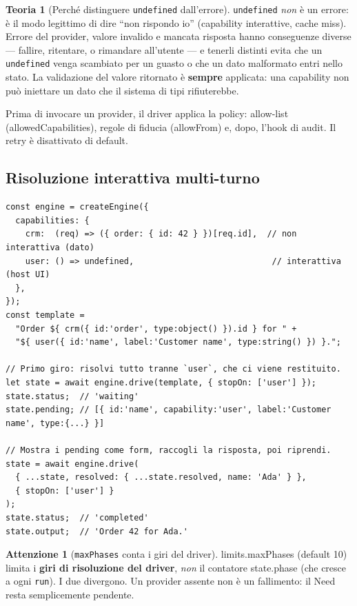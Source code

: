 \documentclass[11pt,a4paper]{book}
\let\code\lstinline
\newcommand{\ic}[1]{{\ttfamily #1}}
\theoremstyle{definition}
\newtheorem*{teoria}{Teoria}
\newtheorem*{attenzione}{Attenzione}
\begin{document}
{{{{\begin{teoria}[Perché distinguere \texttt{undefined} dall'errore]
\code|undefined| \emph{non} è un errore: è il modo legittimo di dire ``non rispondo
io'' (capability interattive, cache miss). Errore del provider, valore invalido e
mancata risposta hanno conseguenze diverse --- fallire, ritentare, o rimandare
all'utente --- e tenerli distinti evita che un \code|undefined| venga scambiato per
un guasto o che un dato malformato entri nello stato. La validazione del valore
ritornato è \textbf{sempre} applicata: una capability non può iniettare un dato che
il sistema di tipi rifiuterebbe.
\end{teoria}

Prima di invocare un provider, il driver applica la \ic{policy}: allow-list
(\ic{allowedCapabilities}), regole di fiducia (\ic{allowFrom}) e, dopo, l'hook di
audit. Il retry è disattivato di default.

\subsection{Risoluzione interattiva multi-turno}

\begin{lstlisting}
const engine = createEngine({
  capabilities: {
    crm:  (req) => ({ order: { id: 42 } })[req.id],  // non interattiva (dato)
    user: () => undefined,                            // interattiva (host UI)
  },
});
const template =
  "Order ${ crm({ id:'order', type:object() }).id } for " +
  "${ user({ id:'name', label:'Customer name', type:string() }) }.";

// Primo giro: risolvi tutto tranne `user`, che ci viene restituito.
let state = await engine.drive(template, { stopOn: ['user'] });
state.status;  // 'waiting'
state.pending; // [{ id:'name', capability:'user', label:'Customer name', type:{...} }]

// Mostra i pending come form, raccogli la risposta, poi riprendi.
state = await engine.drive(
  { ...state, resolved: { ...state.resolved, name: 'Ada' } },
  { stopOn: ['user'] }
);
state.status;  // 'completed'
state.output;  // 'Order 42 for Ada.'
\end{lstlisting}

\begin{attenzione}[\texttt{maxPhases} conta i giri del driver]
\ic{limits.maxPhases} (default 10) limita i \textbf{giri di risoluzione del driver},
\emph{non} il contatore \ic{state.phase} (che cresce a ogni \code|run|). I due
divergono. Un provider assente non è un fallimento: il Need resta semplicemente
pendente.
\end{attenzione}

}}}}
\end{document}
